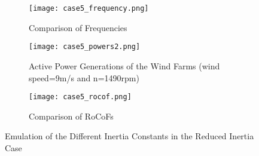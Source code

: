 \begin{figure}[h!]
	\centering
	\begin{subfigure}{0.9\textwidth} %
		\centering	\texttt{[image: case5\_frequency.png]}
		\caption{Comparison of Frequencies}		
		\label{Case5_freq}
	\end{subfigure}
	\vspace{0.1em} %
	\begin{subfigure}{0.9\textwidth}
		\centering	\texttt{[image: case5\_powers2.png]}
		\caption{Active Power Generations of the Wind Farms (wind speed=9m/s and n=1490rpm)}
		\label{Case5_power}	
	\end{subfigure}
	\vspace{0.1em} %
	\begin{subfigure}{0.9\textwidth}
		\centering	
		\texttt{[image: case5\_rocof.png]}
		\caption{Comparison of RoCoFs}
		\label{Case5_rocof}	
	\end{subfigure}
	\caption{Emulation of the Different Inertia Constants in the Reduced Inertia Case}
\end{figure}
